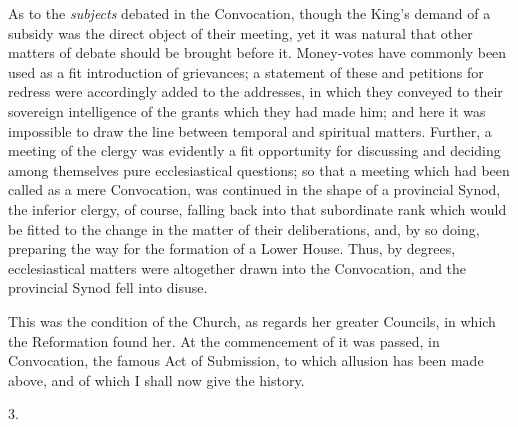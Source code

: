 As to the \emph{subjects}
debated in the Convocation, though the King's demand of a subsidy was
the direct object of their meeting, yet it was natural that other
matters of debate should be brought before it. Money-votes have
commonly been used as a fit introduction of grievances; a statement of
these and petitions for redress were accordingly added to the
addresses, in which they conveyed to their sovereign intelligence of
the grants which they had made him; and here it was impossible to draw
the line between temporal and spiritual matters. Further, a meeting of
the clergy was evidently a fit opportunity for discussing and deciding
among themselves pure ecclesiastical questions; so that a meeting
which had been called as a mere Convocation, was continued in the
shape of a provincial Synod, the inferior clergy, of course, falling
back into that subordinate rank which would be fitted to the change in
the matter of their deliberations, and, by so doing, preparing the way
for the formation of a Lower House. Thus, by degrees, ecclesiastical
matters were altogether drawn into the Convocation, and the provincial
Synod fell into disuse.

This was the condition of the
Church, as regards her greater Councils, in which the Reformation
found her. At the commencement of it was passed, in Convocation, the
famous Act of Submission, to which allusion has been made above, and
of which I shall now give the history.

3.

